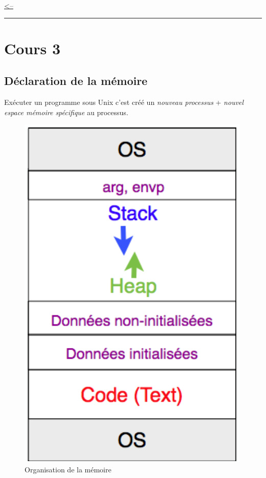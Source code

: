\href{../README.md}{\textless--}

\begin{center}\rule{0.5\linewidth}{0.5pt}\end{center}

\section{Cours 3}\label{cours-3}

\subsection{Déclaration de la
mémoire}\label{duxe9claration-de-la-muxe9moire}

Exécuter un programme sous Unix c'est créé un \emph{nouveau processus} +
\emph{nouvel espace mémoire spécifique} au processus.

\begin{figure}
\centering
\includegraphics{image-47.png}
\caption{Organisation de la mémoire}
\end{figure}

